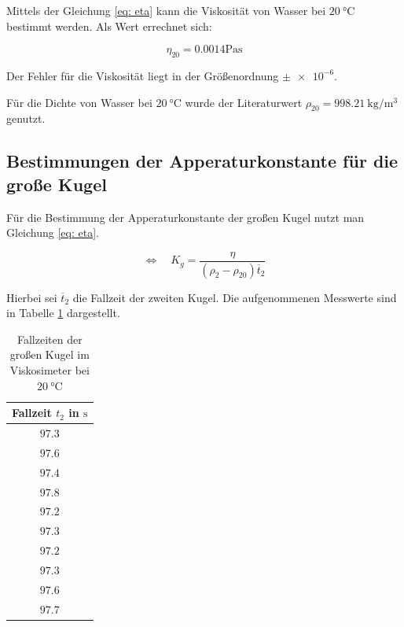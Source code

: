 Mittels der Gleichung \eqref{eq: eta} kann die Viskosität
von Wasser bei $\SI{20}{\degreeCelsius}$ bestimmt werden.
Als Wert errechnet sich:

\begin{equation}
\label{eq:viskosi_wasser}
\eta_{20}= \num{0.0014} \si{\pascal\second}
\end{equation}

Der Fehler für die Viskosität liegt in der Größenordnung $\pm\num{e-6}$. %

Für die Dichte von Wasser bei $\SI{20}{\degreeCelsius}$ wurde der Literaturwert $\rho_{20}=\SI{998.21}{\kilogram\per\cubic\meter}$
genutzt\cite{lit_dichte}.

\subsection{Bestimmungen der Apperaturkonstante für die große Kugel}
Für die Bestimmung der Apperaturkonstante der großen Kugel nutzt man Gleichung \eqref{eq: eta}.

\begin{equation*}
\Leftrightarrow \quad K_{g}=\frac{\eta}{\left(\rho_2-\rho_{20}\right)\overline{t}_2}
\end{equation*}

Hierbei sei $\overline{t}_2$ die Fallzeit der zweiten Kugel.
Die aufgenommenen Messwerte sind in Tabelle \ref{tab:messwerte_fallzeit_kugel_gross} dargestellt.

\begin{table}
\centering
\begin{tabular} {c}
  \toprule
  Fallzeit $t_2$ in $\si{\second}$ \\
  \midrule
  $\num{97.3}$ \\
  $\num{97.6}$ \\
  $\num{97.4}$ \\
  $\num{97.8}$ \\
  $\num{97.2}$ \\
  $\num{97.3}$ \\
  $\num{97.2}$ \\
  $\num{97.3}$ \\
  $\num{97.6}$ \\
  $\num{97.7}$ \\
\bottomrule
\end{tabular}
\caption{Fallzeiten der großen Kugel im Viskosimeter bei $\SI{20}{\degreeCelsius}$}
\label{tab:messwerte_fallzeit_kugel_gross}
\end{table}

